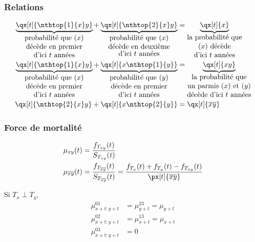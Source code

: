 \documentclass[10pt, french]{article}
\begin{document}
\begin{multicols*}{2}
\subsubsection*{Relations}
\begin{align*}
	\underbrace{\qx[t]{\nthtop{1}{x}y}}_{\shortstack{probabilité que $(x)$\\ décède en premier\\ d'ici $t$ années}}	+	\underbrace{\qx[t]{\nthtop{2}{x}y}}_{\shortstack{probabilité que $(x)$\\ décède en deuxième\\ d'ici $t$ années}}
	&=	\underbrace{\qx[t]{x}}_{\shortstack{la probabilité que\\ $(x)$ décède\\ d'ici $t$ années}}	\\
	\underbrace{\qx[t]{\nthtop{1}{x}y}}_{\shortstack{probabilité que $(x)$\\ décède en premier\\ d'ici $t$ années}}	+	\underbrace{\qx[t]{x\nthtop{1}{y}}}_{\shortstack{probabilité que $(y)$\\ décède en premier\\ d'ici $t$ années}}
	&=	\underbrace{\qx[t]{xy}}_{\shortstack{la probabilité que\\ un parmis $(x)$ et $(y)$\\ décède d'ici $t$ années}}	\\
	\qx[t]{\nthtop{2}{x}y}	+	\qx[t]{x\nthtop{2}{y}}
	&=	\qx[t]{\overline{xy}}
\end{align*}


\subsubsection*{Force de mortalité}
\begin{align*}
	\mu_{xy}(t)
	&=	\frac{f_{T_{xy}}(t)}{S_{T_{xy}}(t)}	\\
	\mu_{\overline{xy}}(t)
	&=	\frac{f_{T_{\overline{xy}}}(t)}{S_{T_{\overline{xy}}}(t)}
	=	\frac{f_{T_{x}}(t) + f_{T_{y}}(t) - f_{T_{xy}}(t)}{\px[t]{\overline{xy}}}
\end{align*}

Si $T_{x} \perp T_{y}$, 
\begin{align*}
	\mu_{x + t : y + t}^{01}
	&=	\mu_{y + t}^{23}
	=	\mu_{y + t}	\\
	\mu_{x + t : y + t}^{02}
	&=	\mu_{x + t}^{13}
	=	\mu_{x + t}	\\
	\mu_{x + t : y + t}^{03}
	&=	0
\end{align*}


\end{multicols*}
\end{document}
